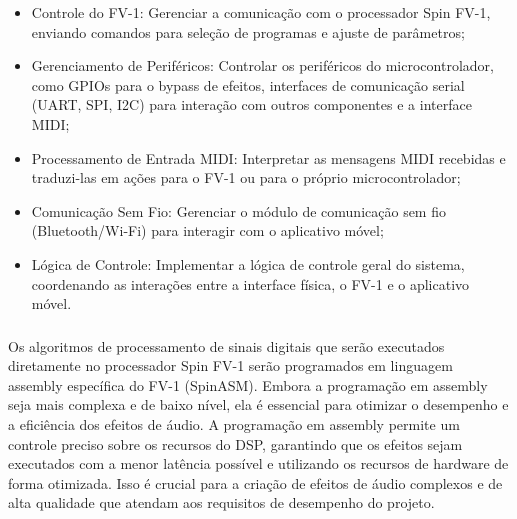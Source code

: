 \begin{itemize}
    \item Controle do FV-1: Gerenciar a comunicação com o processador Spin FV-1, enviando comandos para seleção de programas e ajuste de parâmetros;
    \item Gerenciamento de Periféricos: Controlar os periféricos do microcontrolador, como GPIOs para o bypass de efeitos, interfaces de comunicação serial (UART, SPI, I2C) para interação com outros componentes e a interface MIDI;
    \item Processamento de Entrada MIDI: Interpretar as mensagens MIDI recebidas e traduzi-las em ações para o FV-1 ou para o próprio microcontrolador;
    \item Comunicação Sem Fio: Gerenciar o módulo de comunicação sem fio (Bluetooth/Wi-Fi) para interagir com o aplicativo móvel;
    \item Lógica de Controle: Implementar a lógica de controle geral do sistema, coordenando as interações entre a interface física, o FV-1 e o aplicativo móvel.

\end{itemize}

\subsubsection{}

Os algoritmos de processamento de sinais digitais que serão executados diretamente no processador Spin FV-1 serão programados em linguagem assembly específica do FV-1 (SpinASM). Embora a programação em assembly seja mais complexa e de baixo nível, ela é essencial para otimizar o desempenho e a eficiência dos efeitos de áudio. A programação em assembly permite um controle preciso sobre os recursos do DSP, garantindo que os efeitos sejam executados com a menor latência possível e utilizando os recursos de hardware de forma otimizada. Isso é crucial para a criação de efeitos de áudio complexos e de alta qualidade que atendam aos requisitos de desempenho do projeto.
